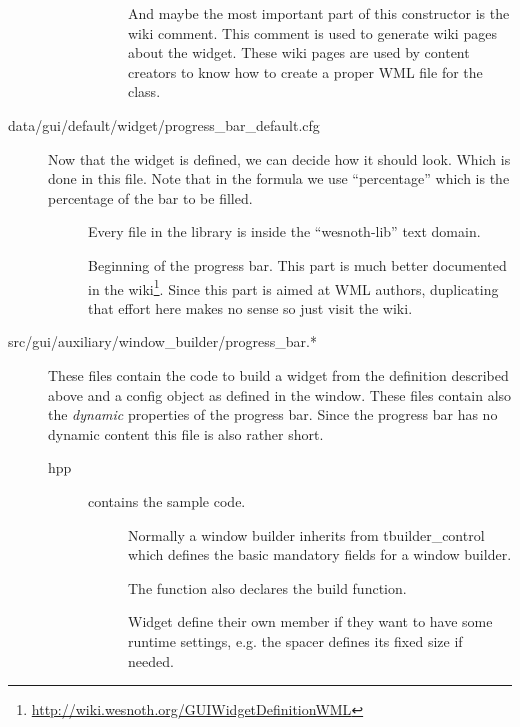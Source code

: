 \begin{description}
\begin{description}
\begin{description}
		And maybe the most important part of this constructor is the wiki
		comment. This comment is used to generate wiki pages about the widget.
		These wiki pages are used by content creators to know how to create a
		proper WML file for the class.
	\end{description}
\end{description}

\item[data/gui/default/widget/progress\_bar\_default.cfg]
	Now that the widget is defined, we can decide how it should look. Which is
	done in this file. Note that in the formula we use ``percentage'' which is
	the percentage of the bar to be filled.

	\begin{description}
	\item[] Every file in the library
		is inside the ``wesnoth-lib'' text domain.

	\item[]
		Beginning of the progress bar. This part is much better documented in
		the wiki\footnote{\url{http://wiki.wesnoth.org/GUIWidgetDefinitionWML}}.
		Since this part is aimed at WML authors, duplicating that effort here
		makes no sense so just visit the wiki.

	\end{description}

\item[src/gui/auxiliary/window\_builder/progress\_bar.*]
	These files contain the code to build a widget from the definition described
	above and a config object as defined in the window. These files contain also the
	\emph{dynamic} properties of the progress bar. Since the progress bar has no
	dynamic content this file is also rather short.

\begin{description}
\item[hpp]  contains the sample code.
	\begin{description}
	\item[] Normally a
		window builder inherits from tbuilder\_control which defines the
		basic mandatory fields for a window builder.

		The function also declares the build function.

		Widget define their own member if they want to have some runtime
		settings, e.g. the spacer defines its fixed size if needed.
	\end{description}


\end{description}
\end{description}
